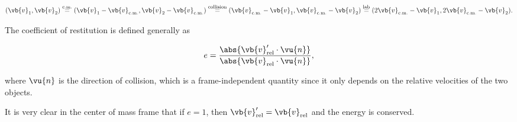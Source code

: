\documentclass[a4paper,12pt]{report}
\begin{document}
\begin{equation}
	(\vb{v} _{1}, \vb{v} _{2}  ) \stackrel{\text{c.m.} }{=} (\vb{v} _{1} - \vb{v} _{\text{c.m.} }, \vb{v} _{2} - \vb{v} _{\text{c.m.} }) \stackrel{\text{collision} }{=} (\vb{v} _{\text{c.m.} } - \vb{v} _{1}, \vb{v} _{\text{c.m.} }- \vb{v} _{2}    ) \stackrel{\text{lab} }{=} (2\vb{v} _{\text{c.m.} }- \vb{v} _{1}, 2\vb{v} _{\text{c.m.} }- \vb{v} _{2} ).
\end{equation}

The coefficient of restitution is defined generally as

\begin{equation}
	e = \frac{\abs{\vb{v} _{\text{rel} }'  \cdot \vu{n} } }{\abs{\vb{v} _{\text{rel} } \cdot \vu{n} } },
\end{equation}

where \(\vu{n} \) is the direction of collision, which is a frame-independent quantity since it only depends on the relative velocities of the two objects.

It is very clear in the center of mass frame that if \(e = 1\), then \(\vb{v} _{\text{rel} }' = \vb{v} _{\text{rel} } \) and the energy is conserved.   
\end{document}
